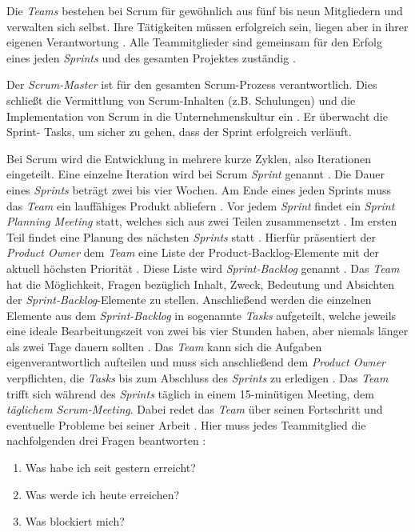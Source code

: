 Die \textit{Teams} bestehen bei Scrum für gewöhnlich aus fünf bis neun Mitgliedern und verwalten sich selbst. Ihre Tätigkeiten müssen erfolgreich sein, liegen aber in ihrer eigenen Verantwortung \cite{Pries2011, Wolf2011}. Alle Teammitglieder sind gemeinsam für den Erfolg eines jeden \textit{Sprints} und des gesamten Projektes zuständig \cite{Pichler2010}. \newline

Der \textit{Scrum-Master} ist für den gesamten Scrum-Prozess verantwortlich. Dies schließt die Vermittlung von Scrum-Inhalten (z.B. Schulungen) und die Implementation von Scrum in die Unternehmenskultur ein \cite{Pichler2010}. Er überwacht die Sprint- Tasks, um sicher zu gehen, dass der Sprint erfolgreich verläuft.\newline

Bei Scrum wird die Entwicklung in mehrere kurze Zyklen, also Iterationen eingeteilt. Eine einzelne Iteration wird bei Scrum \textit{Sprint} genannt \cite{Henning2011}. Die Dauer eines \textit{Sprints} beträgt zwei bis vier Wochen. Am Ende eines jeden Sprints muss das \textit{Team} ein lauffähiges Produkt abliefern \cite{Wolf2011}. Vor jedem \textit{Sprint} findet ein \textit{Sprint Planning Meeting} statt, welches sich aus zwei Teilen zusammensetzt \cite{Pichler2010}. Im ersten Teil findet eine Planung des nächsten \textit{Sprints} statt \cite{Lacey2012}. Hierfür präsentiert der \textit{Product Owner} dem \textit{Team} eine Liste der Product-Backlog-Elemente mit der aktuell höchsten Priorität \cite{Schwaber2004, Schwaber2007,Pichler2010}. Diese Liste wird \textit{Sprint-Backlog} genannt \cite{Wolf2011}. Das \textit{Team} hat die Möglichkeit, Fragen bezüglich Inhalt, Zweck, Bedeutung und Absichten der \textit{Sprint-Backlog}-Elemente zu stellen. Anschließend werden die einzelnen Elemente aus dem \textit{Sprint-Backlog} in sogenannte \textit{Tasks} aufgeteilt, welche jeweils eine ideale Bearbeitungszeit von zwei bis vier Stunden haben, aber niemals länger als zwei Tage dauern sollten \cite{Wolf2011}. Das \textit{Team} kann sich die Aufgaben eigenverantwortlich aufteilen und muss sich anschließend dem \textit{Product  Owner} verpflichten, die \textit{Tasks} bis zum Abschluss des \textit{Sprints} zu erledigen \cite{Wolf2011, Keith2010,Pichler2010}.
Das  \textit{Team} trifft sich während des \textit{Sprints} täglich in einem 15-minütigen Meeting, dem \textit{täglichem Scrum-Meeting}. Dabei redet das \textit{Team} über seinen Fortschritt und eventuelle Probleme bei seiner Arbeit \cite{Keith2010}. Hier muss jedes Teammitglied die nachfolgenden drei Fragen beantworten \cite{Wolf2011}:
   \begin{enumerate}
      \item Was habe ich seit gestern erreicht?
      \item Was werde ich heute erreichen?
      \item Was blockiert mich?
      \end {enumerate}
      
